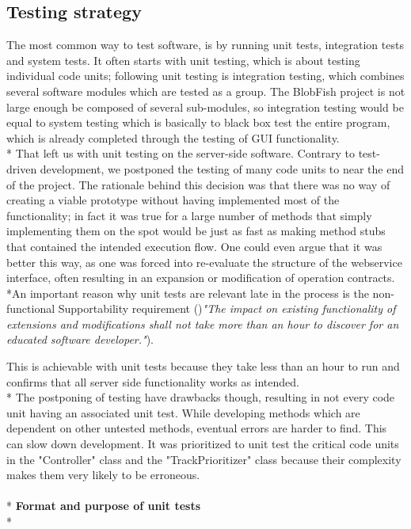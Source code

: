 \documentclass[a4paper,11pt,report]{article}
\begin{document}
\subsection{Testing strategy}
The most common way to test software, is by running unit tests, integration tests and system tests. It often starts with unit testing, which is about testing individual code units; following unit testing is integration testing, which combines several software modules which are tested as a group. The BlobFish project is not large enough be composed of
several sub-modules, so integration testing would be equal to system testing which is basically to black box test the entire program, which is already completed
through the testing of GUI functionality.
\\*
That left us with unit testing on the server-side software. Contrary to test-driven development, we postponed the testing of many code units to near
the end of the project. The rationale behind this decision was that there was no way of creating a viable prototype without having implemented most of the 
functionality; in fact it was true for a large number of methods that simply implementing them on the spot would be just as fast as making method stubs 
that contained the intended execution flow. One could even argue that it was better this way, as one was forced into re-evaluate the structure of the webservice
interface, often resulting in an expansion or modification of operation contracts. \\*An important reason why unit tests are relevant late in the process is the non-functional Supportability requirement 
()\textit{"The impact on existing functionality of extensions and modifications shall not take more than an hour to discover for an educated software developer."}).

This is achievable with unit tests because they take less than an hour to run and confirms that all server side functionality works as intended.
\\*
The postponing of testing have drawbacks though, resulting in not every code unit having an associated unit test. While developing methods which are dependent on other untested methods, eventual errors are harder to find. This can slow down development. It was prioritized to unit test the
critical code units in the "Controller" class and the "TrackPrioritizer" class because their complexity makes them very likely to be erroneous.\\ \\*
\textbf{Format and purpose of unit tests}\\*
\end{document}
